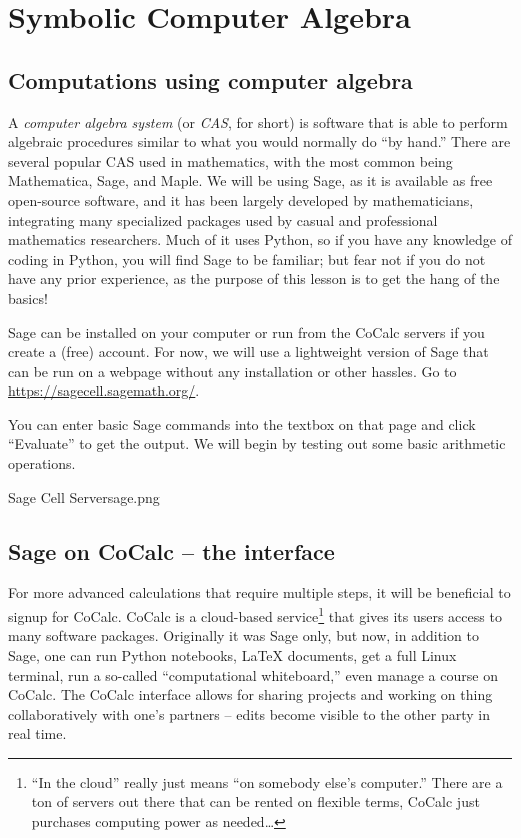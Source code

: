 \chapter{Symbolic Computer Algebra}

\section{Computations using computer algebra}

A \textit{computer algebra system} (or \textit{CAS}, for short) is software
that is able to perform algebraic procedures similar to what you would
normally do ``by hand.'' There are several popular CAS used in mathematics,
with the most common being Mathematica, Sage, and Maple. We will
be using Sage, as it is available as free open-source software, and it has been
largely developed by mathematicians, integrating many specialized packages
used by casual and professional mathematics researchers. Much of it
uses Python, so if you have any knowledge of coding in Python, you will find
Sage to be familiar; but fear not if you do not have any prior experience,
as the purpose of this lesson is to get the hang of the basics!

Sage can be installed on your computer or run from the CoCalc servers
if you create a (free) account. For now, we will use a lightweight version of Sage
that can be run on a webpage without any installation or other hassles.
 Go to \url{https://sagecell.sagemath.org/}.

You can enter basic Sage commands into the textbox on that page and
click ``Evaluate'' to get the output. We will begin by testing out some basic
arithmetic operations.

\clearpage
\begin{worksheet}{6}{Sage Cell Server}{sage.png}

\end{worksheet}
\clearpage



\section{Sage on CoCalc -- the interface}

For more advanced calculations that require multiple
steps, it will be beneficial to signup for CoCalc. CoCalc is a cloud-based service\footnote{``In the cloud'' really just means ``on somebody else's computer.''  There are a ton of servers out there that can be rented on flexible terms, CoCalc just purchases computing power as needed\dots} that gives its users access to many software packages.  Originally it was Sage only, but now, in addition to Sage,  one can run Python notebooks, \LaTeX{} documents, get a full Linux terminal, run a so-called ``computational whiteboard,'' even manage a course on CoCalc.  The CoCalc interface allows for sharing projects and working on thing collaboratively with one's partners -- edits become visible to the other party in real time.

